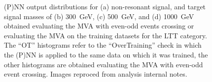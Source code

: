 \begin{figure}
    \quad
    \caption{(P)NN output distributions for 
    (a) non-resonant signal, and target signal masses of 
    (b) 300~GeV, (c) 500~GeV, and (d) 1000~GeV obtained 
    evaluating the MVA with even-odd events crossing or 
    evaluating the MVA on the training datasets for the LTT category. 
    The ``OT'' histograms refer to the ``OverTraining'' check in which 
    the (P)NN is applied to the same data on which it was trained, 
    the other histograms are obtained evaluating the MVA with even-odd event crossing.
    Images reproced from analysis internal notes.}
    \label{fig:overfittingtestLTT}
  \end{figure}

